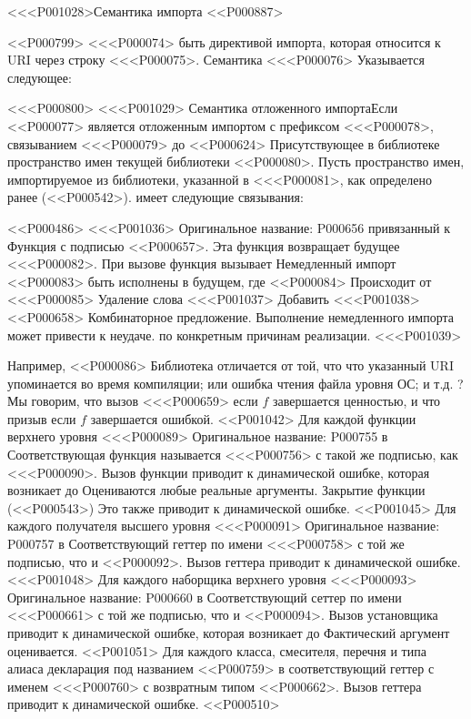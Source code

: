 {{{{{{{{<<<P001028>{Семантика импорта}
<<P000887>

<<P000799>%
<<<P000074> быть директивой импорта, которая относится к URI через строку <<<P000075>.
Семантика <<<P000076> Указывается следующее:

<<<P000800>%
<<<P001029> Семантика отложенного импортаЕсли <<P000077> является отложенным импортом с префиксом <<<P000078>, связыванием <<<P000079> до
<<P000624>
Присутствующее в библиотеке пространство имен текущей библиотеки <<P000080>.
Пусть 
пространство имен, импортируемое из библиотеки, указанной в <<<P000081>,
как определено ранее
(<<P000542>).
 имеет следующие связывания:

<<P000486>
<<<P001036> Оригинальное название: P000656 привязанный к
Функция с подписью <<P000657>.
Эта функция возвращает будущее <<<P000082>.
При вызове функция вызывает
Немедленный импорт <<P000083> быть исполнены в будущем,
где <<P000084> Происходит от <<<P000085> Удаление слова <<<P001037>
Добавить <<<P001038> <<P000658> Комбинаторное предложение.
Выполнение немедленного импорта может привести к неудаче.
по конкретным причинам реализации.
<<<P001039>{%
Например, <<P000086> Библиотека отличается от той, что
что указанный URI упоминается во время компиляции;
или ошибка чтения файла уровня ОС; и т.д.%
?
Мы говорим, что вызов <<<P000659>
 если $f$ завершается ценностью,
и что призыв
 если $f$ завершается ошибкой.
<<P001042>
Для каждой функции верхнего уровня <<<P000089> Оригинальное название: P000755 в
Соответствующая функция называется <<<P000756> с такой же подписью, как <<<P000090>.
Вызов функции приводит к динамической ошибке, которая возникает до
Оцениваются любые реальные аргументы.
Закрытие функции
(<<P000543>)
Это также приводит к динамической ошибке.
<<P001045>
Для каждого получателя высшего уровня <<<P000091> Оригинальное название: P000757 в
Соответствующий геттер по имени <<<P000758> с той же подписью, что и <<P000092>.
Вызов геттера приводит к динамической ошибке.
<<<P001048>
Для каждого наборщика верхнего уровня <<<P000093> Оригинальное название: P000660 в
Соответствующий сеттер по имени <<<P000661> с той же подписью, что и <<P000094>.
Вызов установщика приводит к динамической ошибке, которая возникает до
Фактический аргумент оценивается.
<<P001051>
Для каждого класса, смесителя, перечня и типа алиаса декларация под названием <<P000759> в
соответствующий геттер с именем <<<P000760> с возвратным типом <<P000662>.
Вызов геттера приводит к динамической ошибке.
<<P000510>

}}}}}}}}}
